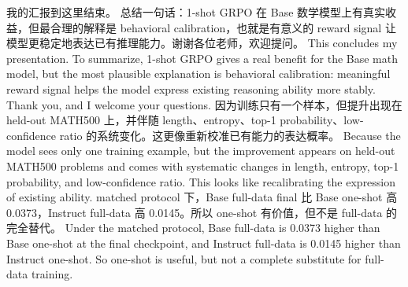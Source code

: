 {}\markdownRendererHorizontalRule{}\markdownRendererInterblockSeparator
{}\markdownRendererInterblockSeparator
{}\markdownRendererInterblockSeparator
{}我的汇报到这里结束。\markdownRendererInterblockSeparator
{}总结一句话：1-shot GRPO 在 Base 数学模型上有真实收益，但最合理的解释是 behavioral calibration，也就是有意义的 reward signal 让模型更稳定地表达已有推理能力。谢谢各位老师，欢迎提问。\markdownRendererInterblockSeparator
{}\markdownRendererInterblockSeparator
{}This concludes my presentation.\markdownRendererInterblockSeparator
{}To summarize, 1-shot GRPO gives a real benefit for the Base math model, but the most plausible explanation is behavioral calibration: meaningful reward signal helps the model express existing reasoning ability more stably. Thank you, and I welcome your questions.\markdownRendererInterblockSeparator
{}\markdownRendererHorizontalRule{}\markdownRendererInterblockSeparator
{}\markdownRendererInterblockSeparator
{}\markdownRendererInterblockSeparator
{}\markdownRendererInterblockSeparator
{}因为训练只有一个样本，但提升出现在 held-out MATH500 上，并伴随 length、entropy、top-1 probability、low-confidence ratio 的系统变化。这更像重新校准已有能力的表达概率。\markdownRendererInterblockSeparator
{}\markdownRendererInterblockSeparator
{}Because the model sees only one training example, but the improvement appears on held-out MATH500 problems and comes with systematic changes in length, entropy, top-1 probability, and low-confidence ratio. This looks like recalibrating the expression of existing ability.\markdownRendererInterblockSeparator
{}\markdownRendererInterblockSeparator
{}\markdownRendererInterblockSeparator
{}matched protocol 下，Base full-data final 比 Base one-shot 高 0.0373，Instruct full-data 高 0.0145。所以 one-shot 有价值，但不是 full-data 的完全替代。\markdownRendererInterblockSeparator
{}\markdownRendererInterblockSeparator
{}Under the matched protocol, Base full-data is 0.0373 higher than Base one-shot at the final checkpoint, and Instruct full-data is 0.0145 higher than Instruct one-shot. So one-shot is useful, but not a complete substitute for full-data training.\markdownRendererInterblockSeparator
